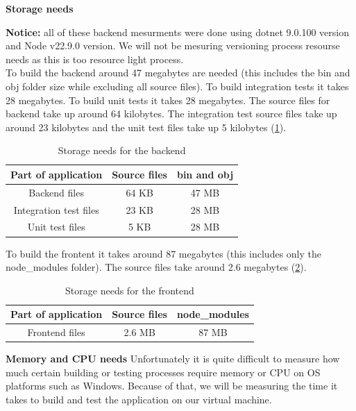 \documentclass[]{VUMIFTemplateClass}
\begin{document}
\textbf{Storage needs}

\textbf{Notice:} all of these backend mesurments were done using dotnet 9.0.100 version and Node v22.9.0 version. We will not be mesuring versioning process resourse needs as this is too resource light process. \\
To build the backend around 47 megabytes are needed (this includes the bin and obj folder size while excluding all source files). To build integration tests it takes 28 megabytes. To build unit tests it takes 28 megabytes.
The source files for backend take up around 64 kilobytes. The integration test source files take up around 23 kilobytes and the unit test files take up 5 kilobytes (\ref{tab:storage-needs}).

\begin{table}[H]
    \centering
    \begin{tabular}{|c|c|c|}
        \hline
        \textbf{Part of application} & \textbf{Source files} & \textbf{bin and obj} \\
        \hline
        Backend files & 64 KB & 47 MB \\
        \hline
        Integration test files & 23 KB & 28 MB \\
        \hline
        Unit test files & 5 KB & 28 MB \\
        \hline
    \end{tabular}
    \caption{Storage needs for the backend}
    \label{tab:storage-needs}
\end{table}

To build the frontent it takes around 87 megabytes (this includes only the node\_modules folder). 
The source files take around 2.6 megabytes (\ref{tab:frontend-storage-needs}).

\begin{table}[H]
    \centering
    \begin{tabular}{|c|c|c|}
        \hline
        \textbf{Part of application} & \textbf{Source files} & \textbf{node\_modules} \\
        \hline
        Frontend files & 2.6 MB & 87 MB \\ 
        \hline
    \end{tabular}
    \caption{Storage needs for the frontend}
    \label{tab:frontend-storage-needs}
\end{table}

\textbf{Memory and CPU needs}
Unfortunately it is quite difficult to measure how much certain building or testing processes require memory or CPU on OS platforms such as Windows.
Because of that, we will be measuring the time it takes to build and test the application on our virtual machine.
\end{document}
